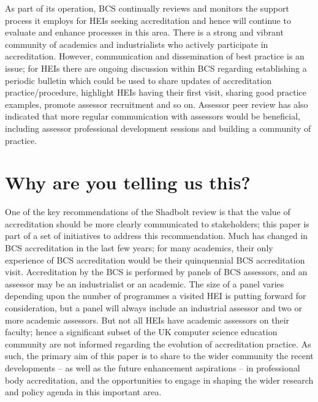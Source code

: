 \documentclass[sigconf]{acmart}
\begin{document}
As part of its operation, BCS continually reviews and monitors the
support process it employs for HEIs seeking accreditation and hence
will continue to evaluate and enhance processes in this area. There is
a strong and vibrant community of academics and industrialists who
actively participate in accreditation. However, communication and
dissemination of best practice is an issue; for HEIs there are ongoing
discussion within BCS regarding establishing a periodic bulletin which
could be used to share updates of accreditation practice/procedure,
highlight HEIs having their first visit, sharing good practice
examples, promote assessor recruitment and so on. Assessor peer review
has also indicated that more regular communication with assessors
would be beneficial, including assessor professional development
sessions and building a community of practice.

\section{Why are you telling us this?}	

One of the key recommendations of the Shadbolt review is that the
value of accreditation should be more clearly communicated to
stakeholders; this paper is part of a set of initiatives to address
this recommendation.  Much has changed in BCS accreditation in the
last few years; for many academics, their only experience of BCS
accreditation would be their quinquennial BCS accreditation
visit. Accreditation by the BCS is performed by panels of BCS
assessors, and an assessor may be an industrialist or an academic. The
size of a panel varies depending upon the number of programmes a
visited HEI is putting forward for consideration, but a panel will
always include an industrial assessor and two or more academic
assessors. But not all HEIs have academic assessors on their faculty;
hence a significant subset of the UK computer science education
community are not informed regarding the evolution of accreditation
practice. As such, the primary aim of this paper is to share to the
wider community the recent developments -- as well as the future
enhancement aspirations -- in professional body accreditation, and the
opportunities to engage in shaping the wider research and policy
agenda in this important area.
\end{document}
